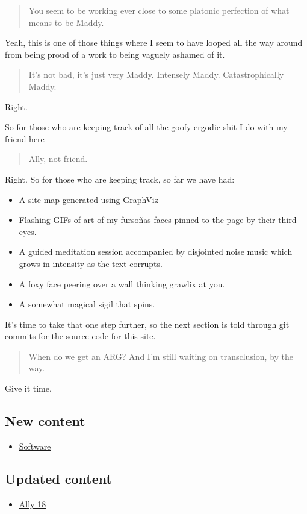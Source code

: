 \begin{quote}
You seem to be working ever close to some platonic perfection of what means to be Maddy.
\end{quote}

Yeah, this is one of those things where I seem to have looped all the way around from being proud of a work to being vaguely ashamed of it.

\begin{quote}
It's not bad, it's just very Maddy. Intensely Maddy. Catastrophically Maddy.
\end{quote}

Right.

So for those who are keeping track of all the goofy ergodic shit I do with my friend here--

\begin{quote}
Ally, not friend.
\end{quote}

Right. So for those who are keeping track, so far we have had:

\begin{itemize}
\tightlist
\item
  A site map generated using GraphViz
\item
  Flashing GIFs of art of my fursoñas faces pinned to the page by their third eyes.
\item
  A guided meditation session accompanied by disjointed noise music which grows in intensity as the text corrupts.
\item
  A foxy face peering over a wall thinking grawlix at you.
\item
  A somewhat magical sigil that spins.
\end{itemize}

It's time to take that one step further, so the next section is told through git commits for the source code for this site.

\begin{quote}
When do we get an ARG? And I'm still waiting on transclusion, by the way.
\end{quote}

Give it time.

\hypertarget{new-content}{%
\subsection{New content}\label{new-content}}

\begin{itemize}
\tightlist
\item
  \href{https://github.com/makyo/ally.drab-makyo.com/pull/4}{Software}
\end{itemize}

\hypertarget{updated-content}{%
\subsection{Updated content}\label{updated-content}}

\begin{itemize}
\tightlist
\item
  \href{/18}{Ally 18}
\end{itemize}
